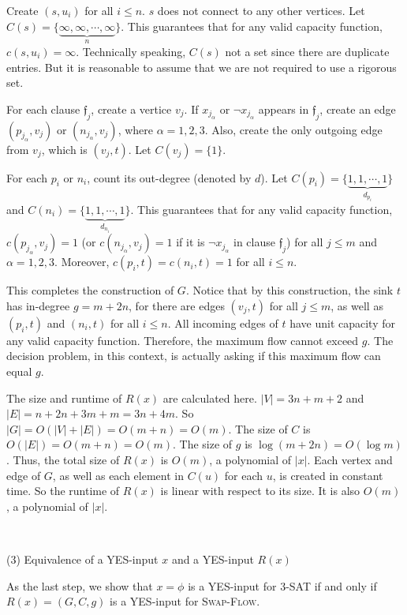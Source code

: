 \documentclass{article}
\begin{document}
Create $(s,u_i)$ for all $i\leqslant n$. $s$ does not connect to any other vertices. Let $C(s)=\{\underbrace{\infty,\infty,\cdots,\infty}_n\}$. This guarantees that for any valid capacity function, $c(s,u_i)=\infty$. Technically speaking, $C(s)$ not a set since there are duplicate entries. But it is reasonable to assume that we are not required to use a rigorous set.

For each clause $\mathfrak{f}_j$, create a vertice $v_j$. If $x_{j_\alpha}$ or $\neg x_{j_\alpha}$ appears in $\mathfrak{f}_j$, create an edge $(p_{j_\alpha},v_j)$ or $(n_{j_\alpha},v_j)$, where $\alpha=1,2,3$. Also, create the only outgoing edge from $v_j$, which is $(v_j,t)$. Let $C(v_j)=\{1\}$.

For each $p_i$ or $n_i$, count its out-degree (denoted by $d$). Let $C(p_i)=\{\underbrace{1,1,\cdots,1}_{d_{p_i}}\}$ and $C(n_i)=\{\underbrace{1,1,\cdots,1}_{d_{n_i}}\}$. This guarantees that for any valid capacity function, $c(p_{j_\alpha},v_j)=1$ (or $c(n_{j_\alpha},v_j)=1$ if it is $\neg x_{j_\alpha}$ in clause $\mathfrak{f}_j$) for all $j\leqslant m$ and $\alpha=1,2,3$. Moreover, $c(p_i,t)=c(n_i,t)=1$ for all $i\leqslant n$.

This completes the construction of $G$. Notice that by this construction, the sink $t$ has in-degree $g=m+2n$, for there are edges $(v_j,t)$ for all $j\leqslant m$, as well as $(p_i,t)$ and $(n_i,t)$ for all $i\leqslant n$. All incoming edges of $t$ have unit capacity for any valid capacity function. Therefore, the maximum flow cannot exceed $g$. The decision problem, in this context, is actually asking if this maximum flow can equal $g$.

The size and runtime of $R(x)$ are calculated here. $|V|=3n+m+2$ and $|E|=n+2n+3m+m=3n+4m$. So $|G|=O(|V|+|E|)=O(m+n)=O(m)$. The size of $C$ is $O(|E|)=O(m+n)=O(m)$. The size of $g$ is $\log(m+2n)=O(\log m)$. Thus, the total size of $R(x)$ is $O(m)$, a polynomial of $|x|$. Each vertex and edge of $G$, as well as each element in $C(u)$ for each $u$, is created in constant time. So the runtime of $R(x)$ is linear with respect to its size. It is also $O(m)$, a polynomial of $|x|$.

~

\noindent(3) Equivalence of a YES-input $x$ and a YES-input $R(x)$

As the last step, we show that $x=\phi$ is a YES-input for \textsc{3-SAT} if and only if $R(x)=(G,C,g)$ is a YES-input for \textsc{Swap-Flow}.

~
\end{document}

